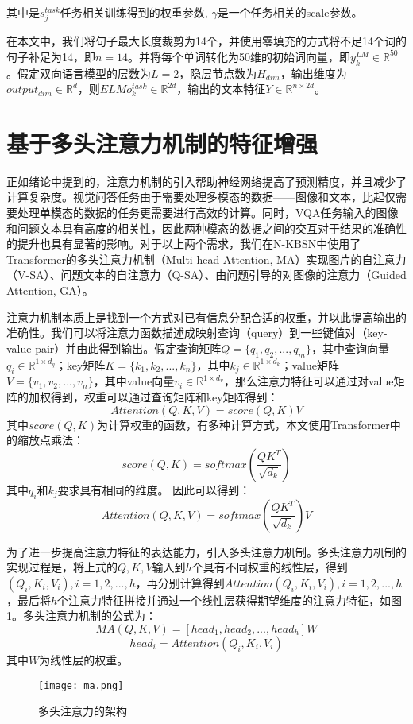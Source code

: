 其中是$s_j^{task}$任务相关训练得到的权重参数, $\gamma$是一个任务相关的scale参数。

在本文中，我们将句子最大长度裁剪为14个，并使用零填充的方式将不足14个词的句子补足为14，即$n=14$。并将每个单词转化为50维的初始词向量，即$y_k^{LM}\in \mathbb{R}^{50}$。假定双向语言模型的层数为$L = 2$，隐层节点数为$H_{dim}$，输出维度为$output_{dim} \in \mathbb{R}^d$，则$ELMo_k^{task} \in \mathbb{R}^{2d}$，输出的文本特征$Y \in \mathbb{R}^{n\times 2d}$。

\section{基于多头注意力机制的特征增强}
正如绪论中提到的，注意力机制的引入帮助神经网络提高了预测精度，并且减少了计算复杂度。视觉问答任务由于需要处理多模态的数据——图像和文本，比起仅需要处理单模态的数据的任务更需要进行高效的计算。同时，VQA任务输入的图像和问题文本具有高度的相关性，因此两种模态的数据之间的交互对于结果的准确性的提升也具有显著的影响。对于以上两个需求，我们在N-KBSN中使用了Transformer的多头注意力机制（Multi-head Attention, MA）实现图片的自注意力（V-SA）、问题文本的自注意力（Q-SA）、由问题引导的对图像的注意力（Guided Attention, GA）。

注意力机制本质上是找到一个方式对已有信息分配合适的权重，并以此提高输出的准确性。我们可以将注意力函数描述成映射查询（query）到一些键值对（key-value pair）并由此得到输出。假定查询矩阵$Q = \{q_1, q_2, ..., q_m\}$，其中查询向量$q_i \in \mathbb{R}^{1 \times d_q}$；key矩阵$K = \{k_1, k_2, ..., k_n\}$，其中$k_j\in \mathbb{R}^{1 \times d_k}$；value矩阵$V = \{v_1, v_2, ..., v_n\}$，其中value向量$v_i \in \mathbb{R}^{1 \times d_v}$，那么注意力特征可以通过对value矩阵的加权得到，权重可以通过查询矩阵和key矩阵得到：
\begin{equation}
Attention(Q, K, V) = score(Q, K)V
\end{equation}
其中$score(Q, K)$为计算权重的函数，有多种计算方式，本文使用Transformer中的缩放点乘法：
\begin{equation}
score(Q, K) = softmax(\frac{QK^T}{\sqrt{d_k}})
\end{equation}
其中$q_i$和$k_j$要求具有相同的维度。
因此可以得到：
\begin{equation}
Attention(Q, K, V) = softmax(\frac{QK^T}{\sqrt{d_k}})V
\end{equation}

为了进一步提高注意力特征的表达能力，引入多头注意力机制。多头注意力机制的实现过程是，将上式的$Q, K, V$输入到$h$个具有不同权重的线性层，得到$(Q_i, K_i, V_i), i = 1, 2, ..., h$，再分别计算得到$Attention(Q_i, K_i, V_i), i = 1, 2, ..., h$，最后将$h$个注意力特征拼接并通过一个线性层获得期望维度的注意力特征，如图\ref{ma}。多头注意力机制的公式为：
\begin{equation}
MA(Q, K, V) = [head_1, head_2, ..., head_h]W
\end{equation}
\begin{equation}
head_i = Attention(Q_i, K_i, V_i)
\end{equation}
其中$W$为线性层的权重。
\begin{figure}[H]
	\texttt{[image: ma.png]}
	\caption{多头注意力的架构}
	\label{ma}
\end{figure}


